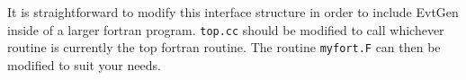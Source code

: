 It is straightforward to modify this interface structure
in order to include EvtGen inside of a larger fortran
program.  {\tt top.cc} should be modified to call
whichever routine is currently the top fortran routine.
The routine {\tt myfort.F} can then be modified to suit
your needs. 









